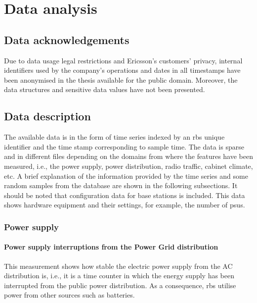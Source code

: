 \chapter{Data analysis}
\label{cha:data_analysis}

\section{Data acknowledgements}

Due to data usage legal restrictions and Ericsson's customers' privacy, internal identifiers used by the company's operations and dates in all timestamps have been anonymised in the thesis available for the public domain. Moreover, the data structures and sensitive data values have not been presented.

\section{Data description}
\label{sec:data_description}

The available data is in the form of time series indexed by an \ac{rbs} unique identifier and the time stamp corresponding to sample time. The data is sparse and in different files depending on the domains from where the features have been measured, i.e., the power supply, power distribution, radio traffic, cabinet climate, etc. A brief explanation of the information provided by the time series and some random samples from the database are shown in the following subsections. It should be noted that configuration data for base stations is included. This data shows hardware equipment and their settings, for example, the number of \acp{psu}. 

\subsection{Power supply}
\label{subsec:data_description:power_supply}

\subsubsection*{Power supply interruptions from the Power Grid distribution}

This measurement shows how stable the electric power supply from the AC distribution is, i.e., it is a time counter in which the energy supply has been interrupted from the public power distribution. 
As a consequence, \ac{rbs} utilise power from other sources such as batteries.

